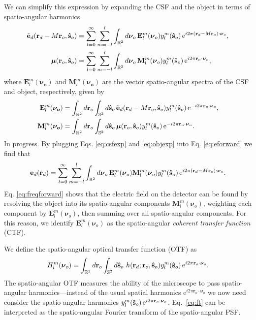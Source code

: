 \documentclass[11pt]{article}
\newcommand{\me}{\mathrm{e}}
\providecommand{\mb}[1]{\mathbf{#1}}
\providecommand{\ro}[1]{\mathbf{\mathbf{r}}_o}
\providecommand{\so}[1]{\mathbf{\hat{s}}_o}
\providecommand{\rd}[1]{\mathbf{r}_d}
\providecommand{\bs}[1]{\boldsymbol{#1}}
\begin{document}
We can simplify this expression by expanding the CSF and the object in terms
of spatio-angular harmonics
\begin{align}
  \tilde{\mb{e}}_d(\rd{} - M\mb{r}_o, \so{}) &= \sum_{l=0}^{\infty} \sum_{m=-l}^l \int_{\mathbb{R}^2}d\bs{\nu}_o{}\, \mb{E}_l^m(\bs{\nu}_o)y_l^m(\so{})\thinspace\me^{i 2\pi (\rd{} - M\ro{})\cdot\bs{\nu}_o},\label{eq:csfexp}\\
    \bs{\mu}(\mb{r}_o, \so{}) &= \sum_{l=0}^{\infty} \sum_{m=-l}^l \int_{\mathbb{R}^2}d\bs{\nu}_o{}\, \mb{M}_l^m(\bs{\nu}_o)y_l^m(\so{})\thinspace\me^{i 2\pi \ro{}\cdot\bs{\nu}_o},\label{eq:objexp}
\end{align}
where $\mb{E}_l^m(\bs{\nu_o})$ and $\mb{M}_l^m(\bs{\nu_o})$ are the
vector spatio-angular spectra of the CSF and object, respectively, given by
\begin{align}
  \mb{E}_l^m(\bs{\nu_o}) &= \int_{\mathbb{R}^2}d\ro{} \int_{\mathbb{S}^2}d\so{}\, \tilde{\mb{e}}_d(\rd{} - M\mb{r}_o, \so{}) y_l^m(\so{})\thinspace\me^{-i 2\pi \ro{}\cdot\bs{\nu}_o},\\
\mb{M}_l^m(\bs{\nu_o}) &= \int_{\mathbb{R}^2}d\ro{} \int_{\mathbb{S}^2}d\so{}\, \bs{\mu}(\mb{r}_o, \so{}) y_l^m(\so{})\thinspace\me^{-i 2\pi \ro{}\cdot\bs{\nu}_o}.
\end{align}
In progress. By plugging Eqs. \ref{eq:csfexp} and \ref{eq:objexp} into
Eq. \ref{eq:eforward} we find that
\begin{align}
  \mb{e}_d(\rd{}) = \sum_{l=0}^{\infty} \sum_{m=-l}^l \int_{\mathbb{R}^2}d\bs{\nu}_o{}\, \mb{E}_l^m(\bs{\nu}_o)\mb{M}_l^m(\bs{\nu}_o)y_l^m(\so{})\thinspace\me^{i 2\pi (\rd{} - M\ro{})\cdot\bs{\nu}_o}. \label{eq:freqforward}
\end{align}
Eq. \ref{eq:freqforward} shows that the electric field on the detector can be
found by resolving the object into its spatio-angular components
$\mb{M}_l^m(\bs{\nu}_o)$, weighting each component by $\mb{E}_l^m(\bs{\nu}_o)$, then
summing over all spatio-angular components. For this reason, we identify
$\mb{E}_l^m(\bs{\nu}_o)$ as the spatio-angular \textit{coherent transfer function}
(CTF).

We define the spatio-angular optical transfer function (OTF) as
\begin{align}
  H_l^m(\bs{\nu}_o) = \int_{\mathbb{R}^3}d\ro{} \int_{\mathbb{S}^2}d\so{}\ h(\rd{}; \ro{}, \so{}) y_l^m(\so{})\thinspace\me^{i 2\pi \ro{}\cdot\bs{\nu}_o}. \label{eq:ft}
\end{align}
The spatio-angular OTF measures the ability of the microscope to pass
spatio-angular harmonics---instead of the usual spatial harmonics
$\me^{i 2\pi \ro{}\cdot\bs{\nu}_o}$ we now need consider the spatio-angular
harmonics $y_l^m(\so{})\thinspace\me^{i 2\pi
  \ro{}\cdot\bs{\nu}_o}$. Eq.~\ref{eq:ft} can be interpreted as the
spatio-angular Fourier transform of the spatio-angular PSF.
\end{document}
